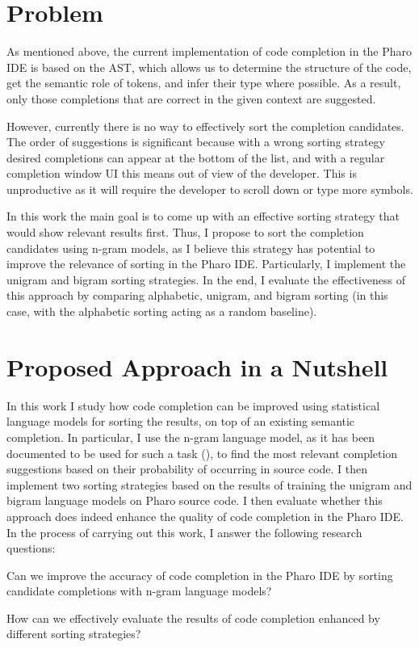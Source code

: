\section{Problem}
\label{sec:Introduction-Problem}
As mentioned above, the current implementation of code completion in the Pharo IDE is based on the AST, which allows us to determine the structure of the code, get the semantic role of tokens, and infer their type where possible. As a result, only those completions that are correct in the given context are suggested.

However, currently there is no way to effectively sort the completion candidates. The order of suggestions is significant because with a wrong sorting strategy desired completions can appear at the bottom of the list, and with a regular completion window UI this means out of view of the developer. This is unproductive as it will require the developer to scroll down or type more symbols. 

In this work the main goal is to come up with an effective sorting strategy that would show relevant results first. Thus, I propose to sort the completion candidates using n-gram models, as I believe this strategy has potential to improve the relevance of sorting in the Pharo IDE. Particularly, I implement the unigram and bigram sorting strategies. In the end, I evaluate the effectiveness of this approach by comparing alphabetic, unigram, and bigram sorting (in this case, with the alphabetic sorting acting as a random baseline).

\section{Proposed Approach in a Nutshell}
\label{sec:Introduction-Approach}
In this work I study how code completion can be improved using statistical language models for sorting the results, on top of an existing semantic completion. In particular, I use the n-gram language model, as it has been documented to be used for such a task (\cite{Hind12a}), to find the most relevant completion suggestions based on their probability of occurring in source code. I then implement two sorting strategies based on the results of training the unigram and bigram language models on Pharo source code. I then evaluate whether this approach does indeed enhance the quality of code completion in the Pharo IDE. In the process of carrying out this work, I answer the following research questions:
\begin{RQ}
    \item Can we improve the accuracy of code completion in the Pharo IDE by sorting candidate completions with n-gram language models?
    \item How can we effectively evaluate the results of code completion enhanced by different sorting strategies?
\end{RQ}

